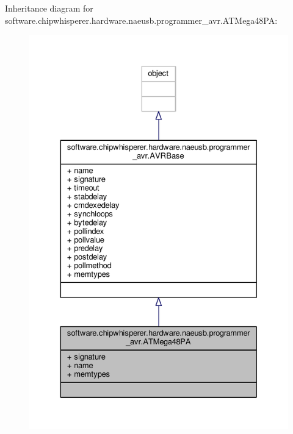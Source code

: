Inheritance diagram for software.\+chipwhisperer.\+hardware.\+naeusb.\+programmer\+\_\+avr.\+A\+T\+Mega48\+P\+A\+:\nopagebreak
\begin{figure}[H]
\begin{center}
\leavevmode
\includegraphics[width=329pt]{df/d23/classsoftware_1_1chipwhisperer_1_1hardware_1_1naeusb_1_1programmer__avr_1_1ATMega48PA__inherit__graph}
\end{center}
\end{figure}


